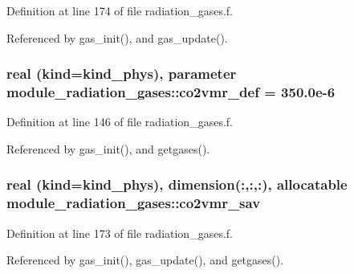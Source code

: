 Definition at line 174 of file radiation\+\_\+gases.\+f.



Referenced by gas\+\_\+init(), and gas\+\_\+update().

\subsubsection[{\texorpdfstring{co2vmr\+\_\+def}{co2vmr_def}}]{\setlength{\rightskip}{0pt plus 5cm}real (kind=kind\+\_\+phys), parameter module\+\_\+radiation\+\_\+gases\+::co2vmr\+\_\+def = 350.\+0e-\/6\hspace{0.3cm}{\ttfamily [private]}}\hypertarget{namespacemodule__radiation__gases_a4fb5ca2e3bfaed7848d7602a22499e76}{}\label{namespacemodule__radiation__gases_a4fb5ca2e3bfaed7848d7602a22499e76}


Definition at line 146 of file radiation\+\_\+gases.\+f.



Referenced by gas\+\_\+init(), and getgases().

\subsubsection[{\texorpdfstring{co2vmr\+\_\+sav}{co2vmr_sav}}]{\setlength{\rightskip}{0pt plus 5cm}real (kind=kind\+\_\+phys), dimension(\+:,\+:,\+:), allocatable module\+\_\+radiation\+\_\+gases\+::co2vmr\+\_\+sav\hspace{0.3cm}{\ttfamily [private]}}\hypertarget{namespacemodule__radiation__gases_a4f35e5db780a64963dc65b8449def39d}{}\label{namespacemodule__radiation__gases_a4f35e5db780a64963dc65b8449def39d}


Definition at line 173 of file radiation\+\_\+gases.\+f.



Referenced by gas\+\_\+init(), gas\+\_\+update(), and getgases().

